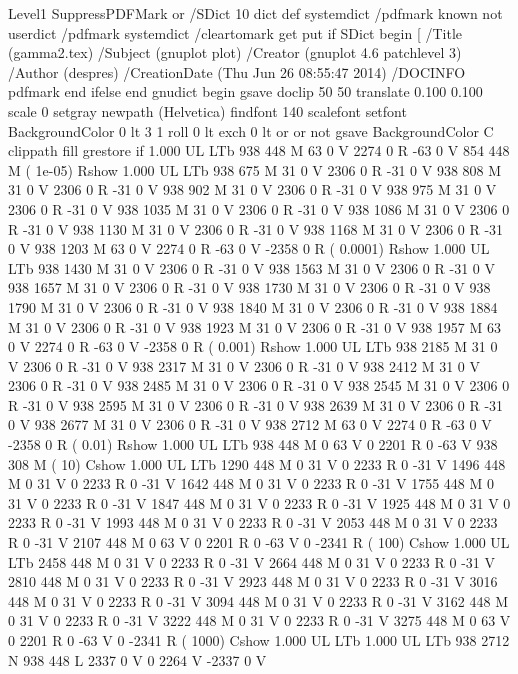 Level1 SuppressPDFMark or 
{} {
/SDict 10 dict def
systemdict /pdfmark known not {
  userdict /pdfmark systemdict /cleartomark get put
} if
SDict begin [
  /Title (gamma2.tex)
  /Subject (gnuplot plot)
  /Creator (gnuplot 4.6 patchlevel 3)
  /Author (despres)
  /CreationDate (Thu Jun 26 08:55:47 2014)
  /DOCINFO pdfmark
end
} ifelse
end
gnudict begin
gsave
doclip
50 50 translate
0.100 0.100 scale
0 setgray
newpath
(Helvetica) findfont 140 scalefont setfont
BackgroundColor 0 lt 3 1 roll 0 lt exch 0 lt or or not {gsave BackgroundColor C clippath fill grestore} if
1.000 UL
LTb
938 448 M
63 0 V
2274 0 R
-63 0 V
854 448 M
( 1e-05) Rshow
1.000 UL
LTb
938 675 M
31 0 V
2306 0 R
-31 0 V
938 808 M
31 0 V
2306 0 R
-31 0 V
938 902 M
31 0 V
2306 0 R
-31 0 V
938 975 M
31 0 V
2306 0 R
-31 0 V
938 1035 M
31 0 V
2306 0 R
-31 0 V
938 1086 M
31 0 V
2306 0 R
-31 0 V
938 1130 M
31 0 V
2306 0 R
-31 0 V
938 1168 M
31 0 V
2306 0 R
-31 0 V
938 1203 M
63 0 V
2274 0 R
-63 0 V
-2358 0 R
( 0.0001) Rshow
1.000 UL
LTb
938 1430 M
31 0 V
2306 0 R
-31 0 V
938 1563 M
31 0 V
2306 0 R
-31 0 V
938 1657 M
31 0 V
2306 0 R
-31 0 V
938 1730 M
31 0 V
2306 0 R
-31 0 V
938 1790 M
31 0 V
2306 0 R
-31 0 V
938 1840 M
31 0 V
2306 0 R
-31 0 V
938 1884 M
31 0 V
2306 0 R
-31 0 V
938 1923 M
31 0 V
2306 0 R
-31 0 V
938 1957 M
63 0 V
2274 0 R
-63 0 V
-2358 0 R
( 0.001) Rshow
1.000 UL
LTb
938 2185 M
31 0 V
2306 0 R
-31 0 V
938 2317 M
31 0 V
2306 0 R
-31 0 V
938 2412 M
31 0 V
2306 0 R
-31 0 V
938 2485 M
31 0 V
2306 0 R
-31 0 V
938 2545 M
31 0 V
2306 0 R
-31 0 V
938 2595 M
31 0 V
2306 0 R
-31 0 V
938 2639 M
31 0 V
2306 0 R
-31 0 V
938 2677 M
31 0 V
2306 0 R
-31 0 V
938 2712 M
63 0 V
2274 0 R
-63 0 V
-2358 0 R
( 0.01) Rshow
1.000 UL
LTb
938 448 M
0 63 V
0 2201 R
0 -63 V
938 308 M
( 10) Cshow
1.000 UL
LTb
1290 448 M
0 31 V
0 2233 R
0 -31 V
1496 448 M
0 31 V
0 2233 R
0 -31 V
1642 448 M
0 31 V
0 2233 R
0 -31 V
1755 448 M
0 31 V
0 2233 R
0 -31 V
1847 448 M
0 31 V
0 2233 R
0 -31 V
1925 448 M
0 31 V
0 2233 R
0 -31 V
1993 448 M
0 31 V
0 2233 R
0 -31 V
2053 448 M
0 31 V
0 2233 R
0 -31 V
2107 448 M
0 63 V
0 2201 R
0 -63 V
0 -2341 R
( 100) Cshow
1.000 UL
LTb
2458 448 M
0 31 V
0 2233 R
0 -31 V
2664 448 M
0 31 V
0 2233 R
0 -31 V
2810 448 M
0 31 V
0 2233 R
0 -31 V
2923 448 M
0 31 V
0 2233 R
0 -31 V
3016 448 M
0 31 V
0 2233 R
0 -31 V
3094 448 M
0 31 V
0 2233 R
0 -31 V
3162 448 M
0 31 V
0 2233 R
0 -31 V
3222 448 M
0 31 V
0 2233 R
0 -31 V
3275 448 M
0 63 V
0 2201 R
0 -63 V
0 -2341 R
( 1000) Cshow
1.000 UL
LTb
1.000 UL
LTb
938 2712 N
938 448 L
2337 0 V
0 2264 V
-2337 0 V
